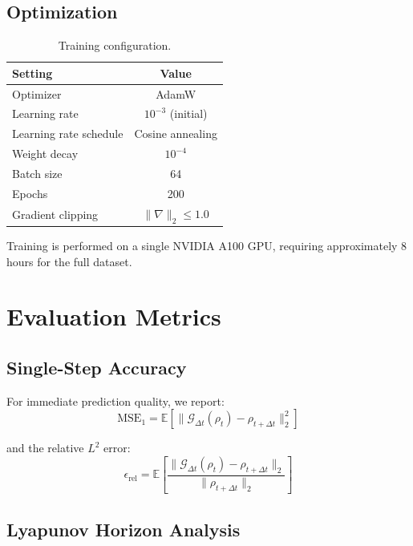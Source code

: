 \documentclass[11pt]{article}
\newcommand{\E}{\mathbb{E}}
\begin{document}
\subsection{Optimization}

\begin{table}[h]
\centering
\begin{tabular}{lc}
\toprule
\textbf{Setting} & \textbf{Value} \\
\midrule
Optimizer & AdamW \\
Learning rate & $10^{-3}$ (initial) \\
Learning rate schedule & Cosine annealing \\
Weight decay & $10^{-4}$ \\
Batch size & 64 \\
Epochs & 200 \\
Gradient clipping & $\|\nabla\|_2 \leq 1.0$ \\
\bottomrule
\end{tabular}
\caption{Training configuration.}
\label{tab:training}
\end{table}

Training is performed on a single NVIDIA A100 GPU, requiring approximately 8 hours for the full dataset.

\section{Evaluation Metrics}

\subsection{Single-Step Accuracy}

For immediate prediction quality, we report:
\begin{equation}
    \text{MSE}_1 = \E\left[ \| \mathcal{G}_{\Delta t}(\rho_t) - \rho_{t+\Delta t} \|_2^2 \right]
\end{equation}

and the relative $L^2$ error:
\begin{equation}
    \epsilon_{\text{rel}} = \E\left[ \frac{\| \mathcal{G}_{\Delta t}(\rho_t) - \rho_{t+\Delta t} \|_2}{\| \rho_{t+\Delta t} \|_2} \right]
\end{equation}

\subsection{Lyapunov Horizon Analysis}
\end{document}
